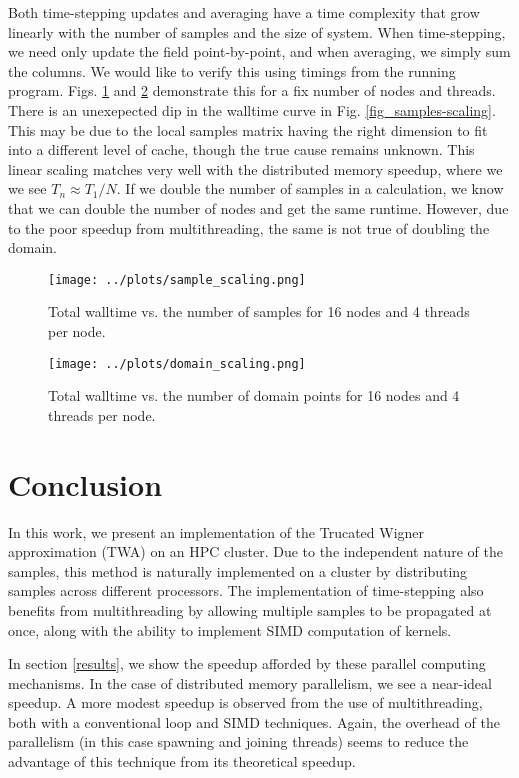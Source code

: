 \documentclass{article}
\begin{document}
Both time-stepping updates and averaging have a time complexity that grow linearly with the number of samples and 
the size of system. When time-stepping, we need only update the field point-by-point, and when averaging, we simply 
sum the columns. We would like to verify this using timings from the running program. Figs. \ref{fig:samples-scaling} 
and \ref{fig:domain-scaling} demonstrate this for a fix number of nodes and threads. There is an unexepected dip in
the walltime curve in Fig. \ref{fig_samples-scaling}. This may be due to the local samples matrix having the right 
dimension to fit into a different level of cache, though the true cause remains unknown. This linear scaling 
matches very well with the distributed memory speedup, where we we see \(T_n \approx T_1/ N\). If we double the number
of samples in a calculation, we know that we can double the number of nodes and get the same runtime. 
However, due to the poor speedup from multithreading, the same is not true of doubling the domain. 

\begin{figure}
    \centering
    \texttt{[image: ../plots/sample\_scaling.png]}
    \caption{Total walltime vs. the number of samples for 16 nodes and 4 threads per node.}
    \label{fig:samples-scaling}
\end{figure}

\begin{figure}
    \centering
    \texttt{[image: ../plots/domain\_scaling.png]}
    \caption{Total walltime vs. the number of domain points for 16 nodes and 4 threads per node.}
    \label{fig:domain-scaling}
\end{figure}

\section{Conclusion} \label{conclusion}

In this work, we present an implementation of the Trucated Wigner approximation (TWA) on an HPC cluster.
Due to the independent nature of the samples, this method is naturally implemented on a cluster by 
distributing samples across different processors. The implementation of time-stepping also benefits from 
multithreading by allowing multiple samples to be propagated at once, along with the ability to 
implement SIMD computation of kernels.

In section \ref{results}, we show the speedup afforded by these parallel computing mechanisms. 
In the case of distributed memory parallelism, we see a near-ideal speedup. 
A more modest speedup is observed 
from the use of multithreading, both with a conventional loop and SIMD techniques. Again, the overhead of 
the parallelism (in this case spawning and joining threads) seems to reduce the advantage of this technique
from its theoretical speedup. 
\end{document}
